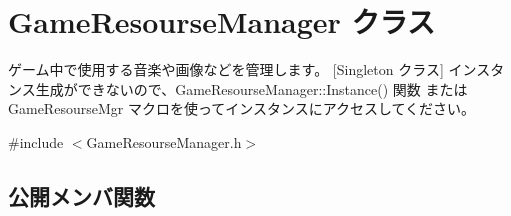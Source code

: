 \hypertarget{class_game_resourse_manager}{}\section{Game\+Resourse\+Manager クラス}
\label{class_game_resourse_manager}


ゲーム中で使用する音楽や画像などを管理します。 \mbox{[}Singleton クラス\mbox{]} インスタンス生成ができないので、\+Game\+Resourse\+Manager\+::\+Instance() 関数 または Game\+Resourse\+Mgr マクロを使ってインスタンスにアクセスしてください。  




{\ttfamily \#include $<$Game\+Resourse\+Manager.\+h$>$}

\subsection*{公開メンバ関数}
